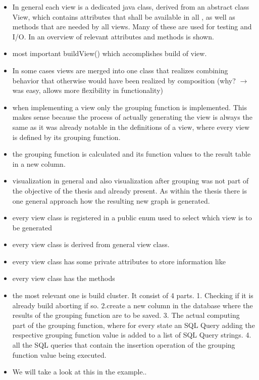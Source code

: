 \documentclass[preview]{standalone}
\begin{document}
\begin{itemize}
	\item In general each view is a dedicated java class, derived from an abstract class View, which contains attributes that shall be available in all \viewsN, as well as methods that are needed by all views. Many of these are used for testing and I/O. In  an overview of relevant attributes and methods is shown. 
	\item most important buildView() which accomplishes build of view.
	\item In some cases views are merged into one class that realizes combining behavior that otherwise would have been realized by composition (why? $\to$ was easy, allows more flexibility in functionality)
	\item when implementing a view only the grouping function is implemented. This makes sense because the process of actually generating the view is always the same as it was already notable in the definitions of a view, where every view is defined by its grouping function.
	\item the grouping function is calculated and its function values to the result table in a new column.
	\item visualization in general and also visualization after grouping was not part of the objective of the thesis and already present. As within the thesis there is one general approach how the resulting new graph is generated.
	\item every view class is registered in a public enum used to select which view is to be generated
	\item every view class is derived from general view class.
	\item every view class has some private attributes to store information like
	\item every view class has the methods
	\item the most relevant one is build cluster. It consist of 4 parts. 1. Checking if it is already build aborting if so. 2.create a new column in the database where the results of the grouping function are to be saved. 3. The actual computing part of the grouping function, where for every state an SQL Query adding the respective grouping function value is added to a list of SQL Query strings. 4. all the SQL queries that contain the insertion operation of the grouping function value being executed.
	\item We will take a look at this in the example..
	
\end{itemize}
\end{document}
